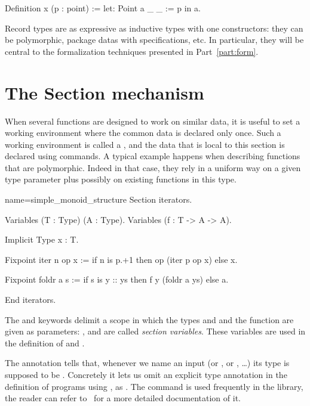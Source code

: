 \begin{coq}{}{}
Definition x (p : point) := let: Point a _ _ := p in a.
\end{coq}

Record types are as expressive as inductive types with one
constructors: they can be polymorphic, package datas with
specifications, etc. In particular, they will be central to the
formalization techniques presented in Part~\ref{part:form}.


\section{The Section mechanism}\label{sec:section}
When several functions are designed to work on similar data, it is
useful to set a working environment where the common data is declared
only once.  Such a working environment is called a , and
the data that is local to this section is declared using 
commands.  A typical example happens when describing functions that
are polymorphic. Indeed in that case, they rely in a uniform way on a
given type parameter plus possibly on existing functions in this type.


\begin{coq}{name=simple_monoid_structure}{}
Section iterators.

Variables (T : Type) (A : Type).
Variables (f : T -> A -> A).

Implicit Type x : T.

Fixpoint iter n op x :=
  if n is p.+1 then op (iter p op x) else x.

Fixpoint foldr a s :=
  if s is y :: ys then f y (foldr a ys) else a.

End iterators.
\end{coq}
The  and  keywords delimit a scope in which
the types  and  and the function  are given as
parameters: ,  and  are called \emph{section
  variables}.  These variables
are used in the definition of  and . 

The  annotation 
tells \Coq{} that, whenever we name
an input  (or , or , \ldots) its type is supposed to be
.  Concretely it lets us omit an explicit type annotation
in the definition of programs using , as .
The   command is used frequently in the
\mcbMC{} library, the reader can refer to~\cite[section 2.7.18]{Coq:manual}
for a more detailed documentation of it.

